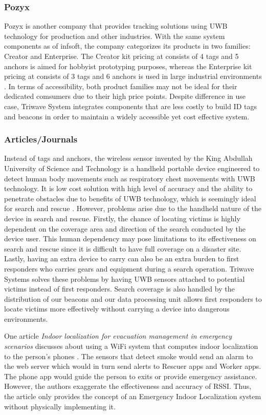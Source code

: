 \subsubsection{Pozyx}
Pozyx is another company that provides tracking solutions using UWB technology for production and other industries. With the same system 
components as of infsoft, the company categorizes its products in two families: Creator and Enterprise. The Creator kit pricing at 
 consists of 4 tags and 5 anchors is aimed for hobbyist prototyping purposes, whereas the Enterprise kit pricing at  
consists of 3 tags and 6 anchors is used in large industrial environments \cite{R3-7}. In terms of accessibility, both product families may 
not be ideal for their dedicated comsumers due to their high price points. Despite difference in use case, Triwave System integrates 
components that are less costly to build ID tags and beacons in order to maintain a widely accessible yet cost effective system. 

\subsubsection{Articles/Journals}
Instead of tags and anchors, the wireless sensor invented by the King Abdullah University of Science and Technology is a handheld portable 
device engineered to detect human body movements such as respiratory chest movements with UWB technology. It is low cost solution with high 
level of accuracy and the ability to penetrate obstacles due to benefits of UWB technology, which is seemingly ideal for search and rescue 
\cite{R3-8}. However, problems arise due to the handheld nature of the device in search and rescue. Firstly, the chance of locating victims
is highly dependent on the coverage area and direction of the search conducted by the device user. This human dependency may pose limitations 
to its effectiveness on search and rescue since it is difficult to have full coverage on a disaster site. Lastly, having an extra device to 
carry can also be an extra burden to first responders who carries gears and equipment during a search operation. Triwave Systems solves these 
problems by having UWB sensors attached to potential victims instead of first responders. Search coverage is also handled by the distribution 
of our beacons and our data processing unit allows first responders to locate victims more effectively without carrying a device into dangerous 
environments.

\bigskip
One article \textit{Indoor localization for evacuation management in emergency scenarios} discusses about using a WiFi system that computes 
indoor localization to the person’s phones \cite{R3-9}. The sensors that detect smoke would send an alarm to the web server which would in turn 
send alerts to Rescuer apps and Worker apps. The phone app would guide the person to exits or provide emergency assistance. However, the authors 
exaggerate the effectiveness and accuracy of RSSI. Thus, the article only provides the concept of an Emergency Indoor Localization system without 
physically implementing it. 
